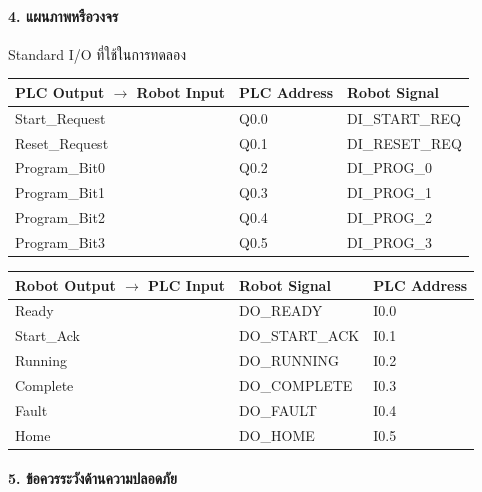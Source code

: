 \paragraph{4. แผนภาพหรือวงจร}

Standard I/O ที่ใช้ในการทดลอง

\begin{table}[htbp]
    \centering
    \begin{tabular}{l l l}
        \hline
        \textbf{PLC Output \(\to\) Robot Input} & \textbf{PLC Address} & \textbf{Robot Signal} \\
        \hline
        Start\_Request & Q0.0 & DI\_START\_REQ \\
        Reset\_Request & Q0.1 & DI\_RESET\_REQ \\
        Program\_Bit0 & Q0.2 & DI\_PROG\_0 \\
        Program\_Bit1 & Q0.3 & DI\_PROG\_1 \\
        Program\_Bit2 & Q0.4 & DI\_PROG\_2 \\
        Program\_Bit3 & Q0.5 & DI\_PROG\_3 \\
        \hline
    \end{tabular}
\end{table}

\begin{table}[htbp]
    \centering
    \begin{tabular}{l l l}
        \hline
        \textbf{Robot Output \(\to\) PLC Input} & \textbf{Robot Signal} & \textbf{PLC Address} \\
        \hline
        Ready & DO\_READY & I0.0 \\
        Start\_Ack & DO\_START\_ACK & I0.1 \\
        Running & DO\_RUNNING & I0.2 \\
        Complete & DO\_COMPLETE & I0.3 \\
        Fault & DO\_FAULT & I0.4 \\
        Home & DO\_HOME & I0.5 \\
        \hline
    \end{tabular}
\end{table}

\paragraph{5. ข้อควรระวังด้านความปลอดภัย}

